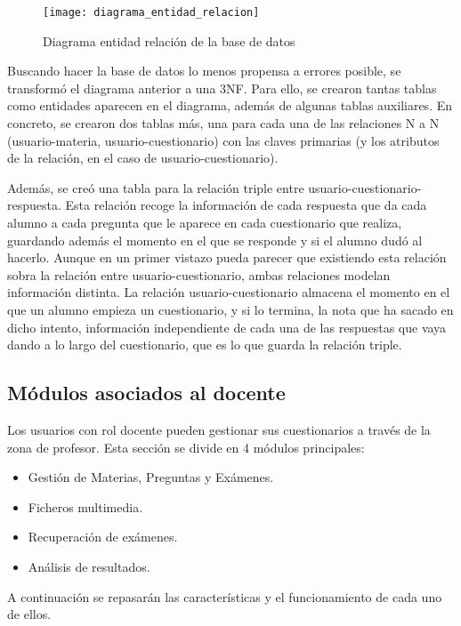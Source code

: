 \begin{figure}[htp!]
	\centering
	\texttt{[image: diagrama\_entidad\_relacion]}
	\caption{Diagrama entidad relación de la base de datos}
	\label{fig:base de datos}
\end{figure}

Buscando hacer la base de datos lo menos propensa a errores posible, se transformó el diagrama anterior a una 3NF. Para ello, se crearon tantas tablas como entidades aparecen en el diagrama, además de algunas tablas auxiliares. En concreto, se crearon dos tablas más, una para cada una de las relaciones N a N (usuario-materia, usuario-cuestionario) con las claves primarias (y los atributos de la relación, en el caso de usuario-cuestionario). 

Además, se creó una tabla para la relación triple entre usuario-cuestionario-respuesta. Esta relación recoge la información de cada respuesta que da cada alumno a cada pregunta que le aparece en cada cuestionario que realiza, guardando además el momento en el que se responde y si el alumno dudó al hacerlo. Aunque en un primer vistazo pueda parecer que existiendo esta relación sobra la relación entre usuario-cuestionario, ambas relaciones modelan información distinta. La relación usuario-cuestionario almacena el momento en el que un alumno empieza un cuestionario, y si lo termina, la nota que ha sacado en dicho intento, información independiente de cada una de las respuestas que vaya dando a lo largo del cuestionario, que es lo que guarda la relación triple.


\subsection{Módulos asociados al docente}

Los usuarios con rol docente pueden gestionar sus cuestionarios a través de la zona de profesor. Esta sección se divide en 4 módulos principales:

\begin{itemize}
	\item Gestión de Materias, Preguntas y Exámenes.
	\item Ficheros multimedia.
	\item Recuperación de exámenes.
	\item Análisis de resultados.
\end{itemize}

A continuación se repasarán las características y el funcionamiento de cada uno de ellos.


